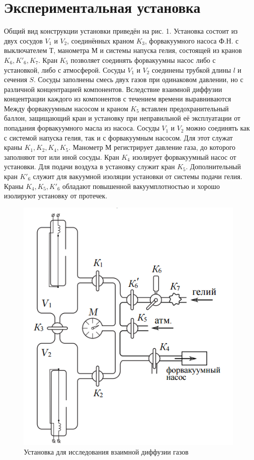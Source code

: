 \documentclass[a4paper, 12pt]{article} %
\begin{document}
\section{Экспериментальная установка}

Общий вид конструкции установки приведён на рис. 1. Установка состоит из двух сосудов $V_1$ и $V_2$, соединённых краном $K_3$, форвакуумного насоса Ф.Н. с выключателем $Т$, манометра $М$ и системы напуска гелия, состоящей из кранов $K_6, K'_6, K_7$. Кран $K_5$ позволяет соединять форвакуумны насос либо с установкой, либо с атмосферой. Сосуды $V_1$ и $V_2$ соединены трубкой длины $l$ и сечения $S$. Сосуды заполнены смесь двух газов при одинаковом давлении, но с различной концентрацией компонентов. Вследствие взаимной диффузии концентрации каждого из компонентов с течением времени выравниваются Между форвакуумным насосом и краном $K_5$ вставлен предохранительный баллон, защищающий кран и установку при неправильной её эксплуатации от попадания форвакуумного масла из насоса. Сосуды $V_1$ и $V_2$ можно соединять как с системой напуска гелия, так и с форвакуумным насосом. Для этот служат краны $K_1, K_2, K_4, K_5$. Манометр М регистрирует давление газа, до которого заполняют тот или иной сосуды. Кран $K_4$ изолирует форвакуумный насос от установки. Для подачи воздуха в установку служит кран $K_5$. Дополнительный кран $K'_6$ служит для вакуумной изоляции установки от системы подачи гелия. Краны $K_4, K_5, K'_6$ обладают повышенной вакуумплотностью и хорошо изолируют установку от протечек.

\begin{figure}[h]
    \centering
    \includegraphics[width = 7.5 cm]{facility.png}
    \caption{Установка для исследования взаимной диффузии газов}
    \label{fig:vac}
\end{figure}
\end{document}
